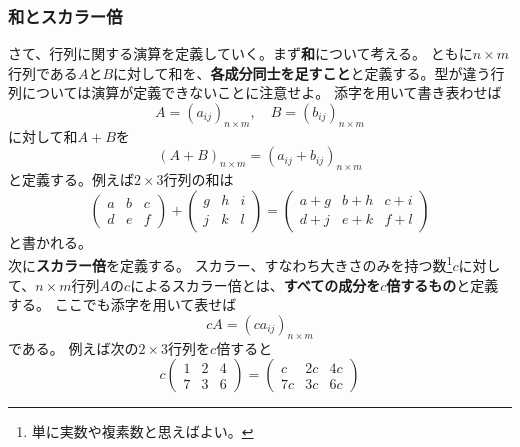 \documentclass[10pt]{jsreport}
\theoremstyle{definition}%
\numberwithin{equation}{section}%
\begin{document}
\subsubsection{和とスカラー倍}
さて、行列に関する演算を定義していく。まず{\bf 和}について考える。
ともに$n\times m$行列である$A$と$B$に対して和を、{\bf 各成分同士を足すこと}と定義する。型が違う行列については演算が定義できないことに注意せよ。
添字を用いて書き表わせば
\begin{equation}
  A=(a_{ij})_{n\times m},\quad B=(b_{ij})_{n\times m}
\end{equation}
に対して和$A+B$を
\begin{equation}
  (A+B)_{n\times m}=(a_{ij}+b_{ij})_{n\times m}
\end{equation}
と定義する。例えば$2\times 3$行列の和は
\begin{equation}
  \left( 
    \begin{matrix}
      a & b & c \\
      d & e & f
    \end{matrix}
  \right)
+
\left( 
  \begin{matrix}
    g & h & i \\
    j & k & l
  \end{matrix}
\right)=\left( 
  \begin{matrix}
    a+g & b+h & c+i \\
    d+j & e+k & f+l
  \end{matrix}
\right)
\end{equation}
と書かれる。\\
次に{\bf スカラー倍}を定義する。
スカラー、すなわち大きさのみを持つ数\footnote{単に実数や複素数と思えばよい。}$c$に対して、$n\times m$行列$A$の$c$によるスカラー倍とは、{\bf すべての成分を$c$倍するもの}と定義する。
ここでも添字を用いて表せば
\begin{equation}
  cA = (ca_{ij})_{n\times m}
\end{equation}
である。
例えば次の$2\times 3$行列を$c$倍すると
\begin{equation}
  c \left( 
       \begin{matrix}
        1 & 2 & 4 \\
        7 & 3 & 6
      \end{matrix}
    \right)
    =
    \left( 
      \begin{matrix}
        c & 2c & 4c \\
        7c & 3c & 6c
      \end{matrix}
    \right)
\end{equation}
\end{document}
